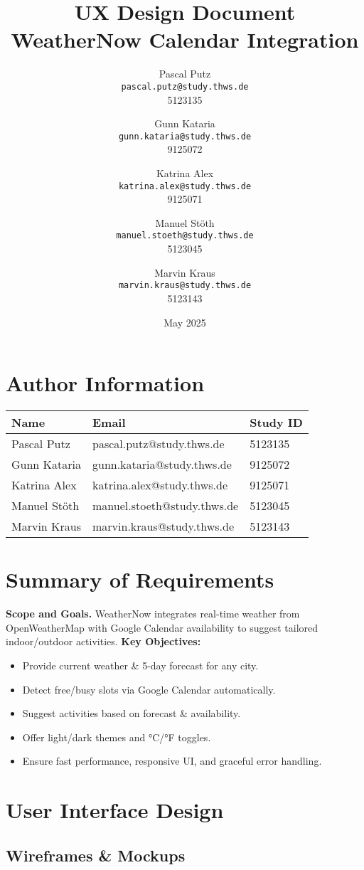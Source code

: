 \documentclass[11pt,a4paper]{article}
\title{UX Design Document\\\large WeatherNow Calendar Integration}
\author{
  Pascal Putz \\ \texttt{pascal.putz@study.thws.de} \\ 5123135
  \and
  Gunn Kataria \\ \texttt{gunn.kataria@study.thws.de} \\ 9125072
  \and
  Katrina Alex \\ \texttt{katrina.alex@study.thws.de} \\ 9125071
  \and
  Manuel Stöth \\ \texttt{manuel.stoeth@study.thws.de} \\ 5123045
  \and
  Marvin Kraus \\ \texttt{marvin.kraus@study.thws.de} \\ 5123143
}
\date{May 2025}
\begin{document}
\maketitle

\section{Author Information}
\begin{longtable}{|p{5cm}|p{6cm}|p{3cm}|}
\hline
\textbf{Name} & \textbf{Email} & \textbf{Study ID} \\
\hline
Pascal Putz & pascal.putz@study.thws.de & 5123135 \\
\hline
Gunn Kataria & gunn.kataria@study.thws.de & 9125072 \\
\hline
Katrina Alex & katrina.alex@study.thws.de & 9125071 \\
\hline
Manuel Stöth & manuel.stoeth@study.thws.de & 5123045 \\
\hline
Marvin Kraus & marvin.kraus@study.thws.de & 5123143 \\
\hline
\end{longtable}

\newpage

\section{Summary of Requirements}
\textbf{Scope and Goals.} WeatherNow integrates real-time weather from OpenWeatherMap with Google Calendar availability to suggest tailored indoor/outdoor activities.  
\textbf{Key Objectives:}
\begin{itemize}[nosep]
  \item Provide current weather \& 5-day forecast for any city.
  \item Detect free/busy slots via Google Calendar automatically.
  \item Suggest activities based on forecast \& availability.
  \item Offer light/dark themes and °C/°F toggles.
  \item Ensure fast performance, responsive UI, and graceful error handling.
\end{itemize}

\section{User Interface Design}

\subsection{Wireframes \& Mockups}
\end{document}
